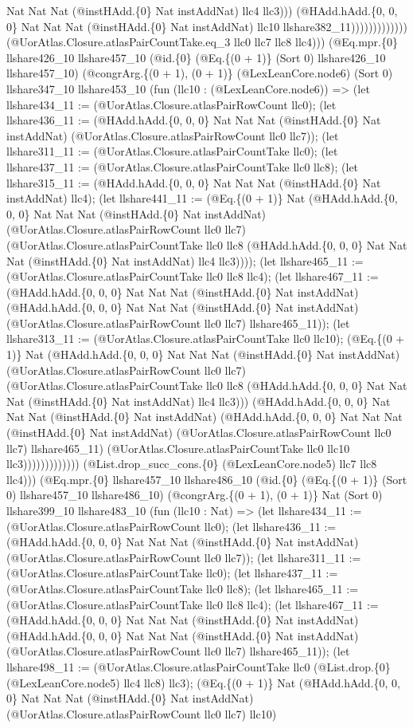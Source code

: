 \documentclass[11pt]{article}
\begin{document}
Nat Nat Nat (@instHAdd.\{0\} Nat instAddNat) llc4 llc3))) (@HAdd.hAdd.\{0, 0, 0\} Nat Nat Nat (@instHAdd.\{0\} Nat instAddNat) llc10 llshare382\_11))))))))))))) (@UorAtlas.Closure.atlasPairCountTake.eq\_3 llc0 llc7 llc8 llc4))) (@Eq.mpr.\{0\} llshare426\_10 llshare457\_10 (@id.\{0\} (@Eq.\{(0 + 1)\} (Sort 0) llshare426\_10 llshare457\_10) (@congrArg.\{(0 + 1), (0 + 1)\} (@LexLeanCore.node6) (Sort 0) llshare347\_10 llshare453\_10 (fun (llc10 : (@LexLeanCore.node6)) => (let llshare434\_11 := (@UorAtlas.Closure.atlasPairRowCount llc0); (let llshare436\_11 := (@HAdd.hAdd.\{0, 0, 0\} Nat Nat Nat (@instHAdd.\{0\} Nat instAddNat) (@UorAtlas.Closure.atlasPairRowCount llc0 llc7)); (let llshare311\_11 := (@UorAtlas.Closure.atlasPairCountTake llc0); (let llshare437\_11 := (@UorAtlas.Closure.atlasPairCountTake llc0 llc8); (let llshare315\_11 := (@HAdd.hAdd.\{0, 0, 0\} Nat Nat Nat (@instHAdd.\{0\} Nat instAddNat) llc4); (let llshare441\_11 := (@Eq.\{(0 + 1)\} Nat (@HAdd.hAdd.\{0, 0, 0\} Nat Nat Nat (@instHAdd.\{0\} Nat instAddNat) (@UorAtlas.Closure.atlasPairRowCount llc0 llc7) (@UorAtlas.Closure.atlasPairCountTake llc0 llc8 (@HAdd.hAdd.\{0, 0, 0\} Nat Nat Nat (@instHAdd.\{0\} Nat instAddNat) llc4 llc3)))); (let llshare465\_11 := (@UorAtlas.Closure.atlasPairCountTake llc0 llc8 llc4); (let llshare467\_11 := (@HAdd.hAdd.\{0, 0, 0\} Nat Nat Nat (@instHAdd.\{0\} Nat instAddNat) (@HAdd.hAdd.\{0, 0, 0\} Nat Nat Nat (@instHAdd.\{0\} Nat instAddNat) (@UorAtlas.Closure.atlasPairRowCount llc0 llc7) llshare465\_11)); (let llshare313\_11 := (@UorAtlas.Closure.atlasPairCountTake llc0 llc10); (@Eq.\{(0 + 1)\} Nat (@HAdd.hAdd.\{0, 0, 0\} Nat Nat Nat (@instHAdd.\{0\} Nat instAddNat) (@UorAtlas.Closure.atlasPairRowCount llc0 llc7) (@UorAtlas.Closure.atlasPairCountTake llc0 llc8 (@HAdd.hAdd.\{0, 0, 0\} Nat Nat Nat (@instHAdd.\{0\} Nat instAddNat) llc4 llc3))) (@HAdd.hAdd.\{0, 0, 0\} Nat Nat Nat (@instHAdd.\{0\} Nat instAddNat) (@HAdd.hAdd.\{0, 0, 0\} Nat Nat Nat (@instHAdd.\{0\} Nat instAddNat) (@UorAtlas.Closure.atlasPairRowCount llc0 llc7) llshare465\_11) (@UorAtlas.Closure.atlasPairCountTake llc0 llc10 llc3))))))))))))) (@List.drop\_succ\_cons.\{0\} (@LexLeanCore.node5) llc7 llc8 llc4))) (@Eq.mpr.\{0\} llshare457\_10 llshare486\_10 (@id.\{0\} (@Eq.\{(0 + 1)\} (Sort 0) llshare457\_10 llshare486\_10) (@congrArg.\{(0 + 1), (0 + 1)\} Nat (Sort 0) llshare399\_10 llshare483\_10 (fun (llc10 : Nat) => (let llshare434\_11 := (@UorAtlas.Closure.atlasPairRowCount llc0); (let llshare436\_11 := (@HAdd.hAdd.\{0, 0, 0\} Nat Nat Nat (@instHAdd.\{0\} Nat instAddNat) (@UorAtlas.Closure.atlasPairRowCount llc0 llc7)); (let llshare311\_11 := (@UorAtlas.Closure.atlasPairCountTake llc0); (let llshare437\_11 := (@UorAtlas.Closure.atlasPairCountTake llc0 llc8); (let llshare465\_11 := (@UorAtlas.Closure.atlasPairCountTake llc0 llc8 llc4); (let llshare467\_11 := (@HAdd.hAdd.\{0, 0, 0\} Nat Nat Nat (@instHAdd.\{0\} Nat instAddNat) (@HAdd.hAdd.\{0, 0, 0\} Nat Nat Nat (@instHAdd.\{0\} Nat instAddNat) (@UorAtlas.Closure.atlasPairRowCount llc0 llc7) llshare465\_11)); (let llshare498\_11 := (@UorAtlas.Closure.atlasPairCountTake llc0 (@List.drop.\{0\} (@LexLeanCore.node5) llc4 llc8) llc3); (@Eq.\{(0 + 1)\} Nat (@HAdd.hAdd.\{0, 0, 0\} Nat Nat Nat (@instHAdd.\{0\} Nat instAddNat) (@UorAtlas.Closure.atlasPairRowCount llc0 llc7) llc10) 
\end{document}

